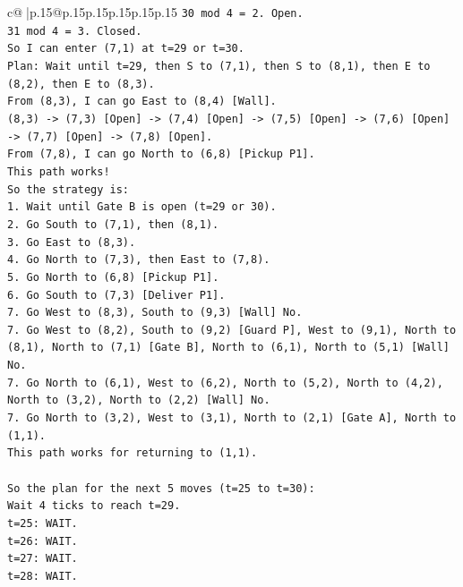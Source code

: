 \documentclass{article}
\begin{document}
{\begin{supertabular}{c@{$\;$}|p{.15\linewidth}@{}p{.15\linewidth}p{.15\linewidth}p{.15\linewidth}p{.15\linewidth}p{.15\linewidth}}
{{{\texttt{30 mod 4 = 2. Open.} \\
\texttt{31 mod 4 = 3. Closed.} \\
\texttt{So I can enter (7,1) at t=29 or t=30.} \\
\texttt{Plan: Wait until t=29, then S to (7,1), then S to (8,1), then E to (8,2), then E to (8,3).} \\
\texttt{From (8,3), I can go East to (8,4) {[}Wall{]}.} \\
\texttt{(8,3) {-}> (7,3) {[}Open{]} {-}> (7,4) {[}Open{]} {-}> (7,5) {[}Open{]} {-}> (7,6) {[}Open{]} {-}> (7,7) {[}Open{]} {-}> (7,8) {[}Open{]}.} \\
\texttt{From (7,8), I can go North to (6,8) {[}Pickup P1{]}.} \\
\texttt{This path works!} \\
\texttt{So the strategy is:} \\
\texttt{1. Wait until Gate B is open (t=29 or 30).} \\
\texttt{2. Go South to (7,1), then (8,1).} \\
\texttt{3. Go East to (8,3).} \\
\texttt{4. Go North to (7,3), then East to (7,8).} \\
\texttt{5. Go North to (6,8) {[}Pickup P1{]}.} \\
\texttt{6. Go South to (7,3) {[}Deliver P1{]}.} \\
\texttt{7. Go West to (8,3), South to (9,3) {[}Wall{]} No.} \\
\texttt{7. Go West to (8,2), South to (9,2) {[}Guard P{]}, West to (9,1), North to (8,1), North to (7,1) {[}Gate B{]}, North to (6,1), North to (5,1) {[}Wall{]} No.} \\
\texttt{7. Go North to (6,1), West to (6,2), North to (5,2), North to (4,2), North to (3,2), North to (2,2) {[}Wall{]} No.} \\
\texttt{7. Go North to (3,2), West to (3,1), North to (2,1) {[}Gate A{]}, North to (1,1).} \\
\texttt{This path works for returning to (1,1).} \\
\\ 
\texttt{So the plan for the next 5 moves (t=25 to t=30):} \\
\texttt{Wait 4 ticks to reach t=29.} \\
\texttt{t=25: WAIT.} \\
\texttt{t=26: WAIT.} \\
\texttt{t=27: WAIT.} \\
\texttt{t=28: WAIT.} \\
}}}
\end{supertabular}}
\end{document}
